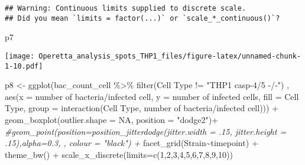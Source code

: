 \documentclass[
]{article}
\newenvironment{Shaded}{\begin{snugshade}}{\end{snugshade}}
\newcommand{\AttributeTok}[1]{\textcolor[rgb]{0.77,0.63,0.00}{#1}}
\newcommand{\CommentTok}[1]{\textcolor[rgb]{0.56,0.35,0.01}{\textit{#1}}}
\newcommand{\ConstantTok}[1]{\textcolor[rgb]{0.00,0.00,0.00}{#1}}
\newcommand{\DecValTok}[1]{\textcolor[rgb]{0.00,0.00,0.81}{#1}}
\newcommand{\FunctionTok}[1]{\textcolor[rgb]{0.00,0.00,0.00}{#1}}
\newcommand{\NormalTok}[1]{#1}
\newcommand{\OtherTok}[1]{\textcolor[rgb]{0.56,0.35,0.01}{#1}}
\newcommand{\SpecialCharTok}[1]{\textcolor[rgb]{0.00,0.00,0.00}{#1}}
\newcommand{\StringTok}[1]{\textcolor[rgb]{0.31,0.60,0.02}{#1}}
\begin{document}
\begin{verbatim}
## Warning: Continuous limits supplied to discrete scale.
## Did you mean `limits = factor(...)` or `scale_*_continuous()`?
\end{verbatim}

\begin{Shaded}
\begin{Highlighting}[]
\NormalTok{p7}
\end{Highlighting}
\end{Shaded}

\texttt{[image: Operetta\_analysis\_spots\_THP1\_files/figure-latex/unnamed-chunk-1-10.pdf]}

\begin{Shaded}
\begin{Highlighting}[]
\NormalTok{p8 }\OtherTok{\textless{}{-}} \FunctionTok{ggplot}\NormalTok{(bac\_count\_cell }\SpecialCharTok{\%\textgreater{}\%}
               \FunctionTok{filter}\NormalTok{(}\StringTok{\textasciigrave{}}\AttributeTok{Cell Type}\StringTok{\textasciigrave{}} \SpecialCharTok{!=} \StringTok{"THP1 casp{-}4/5 {-}/{-}"}\NormalTok{)}
\NormalTok{             , }\FunctionTok{aes}\NormalTok{(}\AttributeTok{x =} \StringTok{\textasciigrave{}}\AttributeTok{number of bacteria/infected cell}\StringTok{\textasciigrave{}}\NormalTok{, }\AttributeTok{y =} \StringTok{\textasciigrave{}}\AttributeTok{number of infected cells}\StringTok{\textasciigrave{}}\NormalTok{, }\AttributeTok{fill =} \StringTok{\textasciigrave{}}\AttributeTok{Cell Type}\StringTok{\textasciigrave{}}\NormalTok{,}
                   \AttributeTok{group =}  \FunctionTok{interaction}\NormalTok{(}\StringTok{\textasciigrave{}}\AttributeTok{Cell Type}\StringTok{\textasciigrave{}}\NormalTok{, }\StringTok{\textasciigrave{}}\AttributeTok{number of bacteria/infected cell}\StringTok{\textasciigrave{}}\NormalTok{))) }\SpecialCharTok{+}
  \FunctionTok{geom\_boxplot}\NormalTok{(}\AttributeTok{outlier.shape =} \ConstantTok{NA}\NormalTok{, }\AttributeTok{position =} \StringTok{"dodge2"}\NormalTok{)}\SpecialCharTok{+}
  \CommentTok{\#geom\_point(position=position\_jitterdodge(jitter.width = .15, jitter.height = .15),alpha=0.3, , colour = "black") +}
  \FunctionTok{facet\_grid}\NormalTok{(Strain}\SpecialCharTok{\textasciitilde{}}\NormalTok{timepoint) }\SpecialCharTok{+}
  \FunctionTok{theme\_bw}\NormalTok{() }\SpecialCharTok{+}
  \FunctionTok{scale\_x\_discrete}\NormalTok{(}\AttributeTok{limits=}\FunctionTok{c}\NormalTok{(}\DecValTok{1}\NormalTok{,}\DecValTok{2}\NormalTok{,}\DecValTok{3}\NormalTok{,}\DecValTok{4}\NormalTok{,}\DecValTok{5}\NormalTok{,}\DecValTok{6}\NormalTok{,}\DecValTok{7}\NormalTok{,}\DecValTok{8}\NormalTok{,}\DecValTok{9}\NormalTok{,}\DecValTok{10}\NormalTok{))}
\end{Highlighting}
\end{Shaded}
\end{document}
